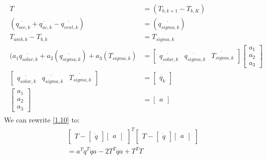 \documentclass{article}
\begin{document}
        \begin{align}
        \begin{split}
            T &= (T_{b,k+1} - T_{b,K})\\
            (\dot{q_{occ,k}}+\dot{q_{ac,k}}-\dot{q_{vent,k}}) &= (\dot{q_{sigma,k}})\\
            T_{amb,k} - T_{b,k} &= T_{sigma,k}\\
            (a_1\dot{q_{solar,k}} + a_2(\dot{q_{sigma,k}}) + a_3(T_{sigma,k}) &= 
            \begin{bmatrix} \dot{q_{solar,k}}&\dot{q_{sigma,k}}&\dot{T_{sigma,k}} \end{bmatrix} 
            \begin{bmatrix} a_1\\a_2\\a_3 \end{bmatrix}\\
            \begin{bmatrix} \dot{q_{solar,k}}&\dot{q_{sigma,k}}&\dot{T_{sigma,k}} \end{bmatrix} &= 
            \begin{bmatrix} \dot{q_k} \end{bmatrix}\\
            \begin{bmatrix} a_1\\a_2\\a_3 \end{bmatrix} &= 
            \begin{bmatrix} a \end{bmatrix}
        \end{split}
        \end{align}
        We can rewrite \eqref{1.10} to:
        \begin{align}
        \begin{split}\label{1.11}
            &\begin{bmatrix}T - \begin{bmatrix} \dot{q} \end{bmatrix} \begin{bmatrix} a \end{bmatrix} \end{bmatrix}^T 
            \begin{bmatrix}T - \begin{bmatrix} \dot{q} \end{bmatrix} \begin{bmatrix} a \end{bmatrix} \end{bmatrix}\\
            &= a^T \dot{q}^T \dot{q} a - 2T^T\dot{q}a + T^TT
        \end{split}
        \end{align}
        
\end{document}
